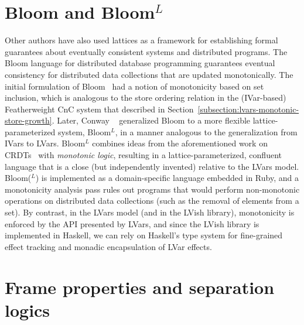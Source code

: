\section{Bloom and Bloom$^L$}

Other authors have also used lattices as a framework for establishing
formal guarantees about eventually consistent systems and distributed
programs.  The Bloom language for distributed database programming
guarantees eventual consistency for distributed data collections that
are updated monotonically.  The initial formulation of
Bloom~\cite{bloom-cidr} had a notion of monotonicity based on set
inclusion, which is analogous to the store ordering relation in the
(IVar-based) Featherweight CnC system that  described in
Section~\ref{subsection:lvars-monotonic-store-growth}.  Later, Conway
\etal~\cite{blooml} generalized Bloom to a more flexible
lattice-parameterized system, Bloom$^L$, in a manner analogous to the
generalization from IVars to LVars.  Bloom$^L$ combines ideas from the
aforementioned work on CRDTs~\cite{crdts, crdts-tr} with
\emph{monotonic logic}, resulting in a lattice-parameterized,
confluent language that is a close (but independently invented)
relative to the LVars model.  Bloom($^L$) is implemented as a
domain-specific language embedded in Ruby, and a monotonicity analysis
pass rules out programs that would perform non-monotonic operations on
distributed data collections (such as the removal of elements from a
set).  By contrast, in the LVars model (and in the LVish library),
monotonicity is enforced by the API presented by LVars, and since the
LVish library is implemented in Haskell, we can rely on Haskell's type
system for fine-grained effect tracking and monadic encapsulation of
LVar effects.

\section{Frame properties and separation logics}\label{s:related-frame-properties-and-separation-logics}

